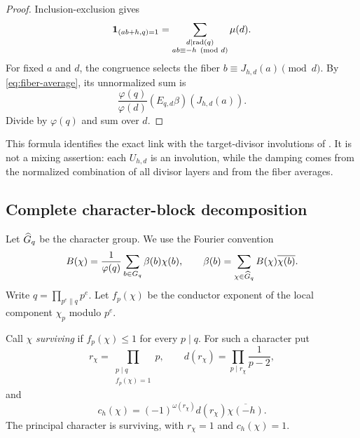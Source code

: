 \begin{proof}
Inclusion-exclusion gives
\[
 \mathbf 1_{(ab+h,q)=1}
 =\sum_{\substack{d\mid\operatorname{rad}(q)\\ab\equiv-h\pmod d}}\mu(d).
\]
For fixed $a$ and $d$, the congruence selects the fiber
$b\equiv J_{h,d}(a)\pmod d$.  By \eqref{eq:fiber-average}, its unnormalized
sum is
\[
 \frac{\varphi(q)}{\varphi(d)}
 (E_{q,d}\beta)(J_{h,d}(a)).
\]
Divide by $\varphi(q)$ and sum over $d$.
\end{proof}

This formula identifies the exact link with the target-divisor involutions
of \citet{WangTPCSix2026}.  It is not a mixing assertion: each $U_{h,d}$ is
an involution, while the damping comes from the normalized combination of
all divisor layers and from the fiber averages.

\subsection{Complete character-block decomposition}

Let $\widehat G_q$ be the character group.  We use the Fourier convention
\begin{equation}\label{eq:Fourier-convention}
 B(\chi)=\frac1{\varphi(q)}\sum_{b\in G_q}\beta(b)\chi(b),
 \qquad
 \beta(b)=\sum_{\chi\in\widehat G_q}B(\chi)\overline{\chi(b)}.
\end{equation}
Write $q=\prod_{p^e\parallel q}p^e$.  Let $f_p(\chi)$ be the conductor
exponent of the local component $\chi_p$ modulo $p^e$.

Call $\chi$ \emph{surviving} if $f_p(\chi)\leq1$ for every $p\mid q$.
For such a character put
\begin{equation}\label{eq:exact-squarefree-conductor}
 r_\chi=\prod_{\substack{p\mid q\\f_p(\chi)=1}}p,
 \qquad
 d(r_\chi)=\prod_{p\mid r_\chi}\frac1{p-2},
\end{equation}
and
\begin{equation}\label{eq:c-multiplier}
 c_h(\chi)
 =(-1)^{\omega(r_\chi)}d(r_\chi)
   \overline{\chi(-h)}.
\end{equation}
The principal character is surviving, with $r_\chi=1$ and $c_h(\chi)=1$.

